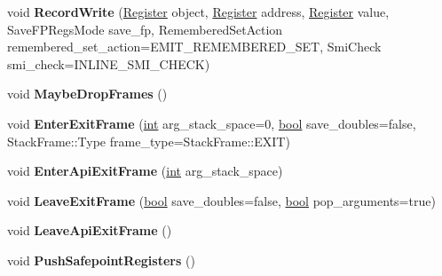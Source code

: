 \begin{DoxyCompactItemize}
\item 
\mbox{\label{classv8_1_1internal_1_1MacroAssembler_a502206b6b95126b45f40bd3c47dc6ab6}} 
void {\bfseries Record\+Write} (\mbox{\hyperlink{classv8_1_1internal_1_1Register}{Register}} object, \mbox{\hyperlink{classv8_1_1internal_1_1Register}{Register}} address, \mbox{\hyperlink{classv8_1_1internal_1_1Register}{Register}} value, Save\+F\+P\+Regs\+Mode save\+\_\+fp, Remembered\+Set\+Action remembered\+\_\+set\+\_\+action=E\+M\+I\+T\+\_\+\+R\+E\+M\+E\+M\+B\+E\+R\+E\+D\+\_\+\+S\+ET, Smi\+Check smi\+\_\+check=I\+N\+L\+I\+N\+E\+\_\+\+S\+M\+I\+\_\+\+C\+H\+E\+CK)
\item 
\mbox{\label{classv8_1_1internal_1_1MacroAssembler_a24c22317b3c647e2829321dade36cf73}} 
void {\bfseries Maybe\+Drop\+Frames} ()
\item 
\mbox{\label{classv8_1_1internal_1_1MacroAssembler_ade1a4b9f7030f31c6ea2a2ed55ba2ace}} 
void {\bfseries Enter\+Exit\+Frame} (\mbox{\hyperlink{classint}{int}} arg\+\_\+stack\+\_\+space=0, \mbox{\hyperlink{classbool}{bool}} save\+\_\+doubles=false, Stack\+Frame\+::\+Type frame\+\_\+type=Stack\+Frame\+::\+E\+X\+IT)
\item 
\mbox{\label{classv8_1_1internal_1_1MacroAssembler_addc6d1f3c9ee70b6743eabfd0d03c0d7}} 
void {\bfseries Enter\+Api\+Exit\+Frame} (\mbox{\hyperlink{classint}{int}} arg\+\_\+stack\+\_\+space)
\item 
\mbox{\label{classv8_1_1internal_1_1MacroAssembler_ac18add28d7a386ad1bc5fe6b28f6354b}} 
void {\bfseries Leave\+Exit\+Frame} (\mbox{\hyperlink{classbool}{bool}} save\+\_\+doubles=false, \mbox{\hyperlink{classbool}{bool}} pop\+\_\+arguments=true)
\item 
\mbox{\label{classv8_1_1internal_1_1MacroAssembler_aefbc121a575d14280652182962e4f94b}} 
void {\bfseries Leave\+Api\+Exit\+Frame} ()
\item 
\mbox{\label{classv8_1_1internal_1_1MacroAssembler_aca545d9193d7a468e285a5ba66fb6f19}} 
void {\bfseries Push\+Safepoint\+Registers} ()

\end{DoxyCompactItemize}
